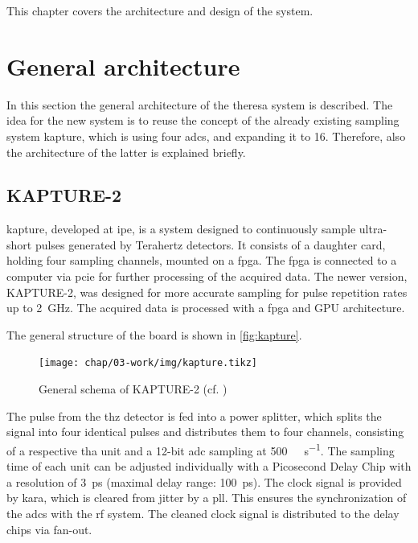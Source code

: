 This chapter covers the architecture and design of the system.
\section{General architecture}
In this section the general architecture of the \gls{theresa} system is described.
The idea for the new system is to reuse the concept of the already existing sampling system \gls{kapture}, which is using four \glspl{adc}, and expanding it to 16. Therefore, also the architecture of the latter is explained briefly.
\subsection{KAPTURE-2}
\Gls{kapture}, developed at \gls{ipe}, is a system designed to continuously sample ultra-short pulses generated by Terahertz detectors. %
It consists of a daughter card, holding four sampling channels, mounted on a \gls{fpga}. The \gls{fpga} is connected to a computer via \gls{pcie} for further processing of the acquired data. \cite{brosi}
The newer version, KAPTURE-2, was designed for more accurate sampling for pulse repetition rates up to \SI{2}{\giga \hertz}. The acquired data is processed with a \gls{fpga} and GPU architecture.  \cite{caselleKAP}

The general structure of the board is shown in \autoref{fig:kapture}.

\begin{figure}[H]
	\centering
	\texttt{[image: chap/03-work/img/kapture.tikz]}
	\caption{General schema of KAPTURE-2 (cf. \cite[p.2]{caselleKAP})}
	\label{fig:kapture}
\end{figure}


The pulse from the \gls{thz} detector is fed into a power splitter, which splits the signal into four identical pulses and distributes them to four channels, consisting of a respective \gls{tha} unit and a 12-bit \gls{adc} sampling at \SI{500}{\mega\sample\per\second}. The sampling time of each unit can be adjusted individually with a Picosecond Delay Chip with a resolution of \SI{3}{\pico \second} (maximal delay range: \SI{100}{\pico \second}). %
The clock signal is provided by \gls{kara}, which is cleared from jitter by a \gls{pll}. This ensures the synchronization of the \glspl{adc} with the \gls{rf} system. The cleaned clock signal is distributed to the delay chips via fan-out. \cite{caselleKAP}

